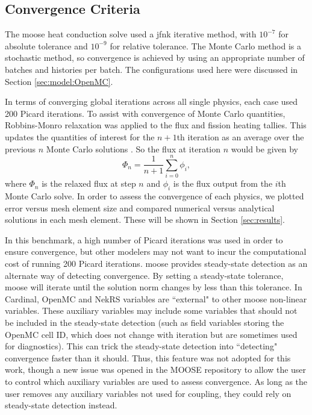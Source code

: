\documentclass[letterpaper]{mc2023}
\begin{document}
\subsection{Convergence Criteria}
The \gls{moose} heat conduction solve used a \gls{jfnk} iterative method, with $10^{-7}$ for absolute tolerance and $10^{-9}$ for
relative tolerance. The Monte Carlo method is a stochastic method, so convergence is achieved by using an appropriate number of
batches and histories per batch. The configurations used here were discussed in Section \ref{sec:model:OpenMC}.

In terms of converging global iterations across all single physics, each case used 200 Picard iterations. To assist with
convergence of Monte Carlo quantities, Robbins-Monro relaxation was applied to the flux and fission heating tallies. This updates the
quantities of interest for the $n+1$th iteration as an average over the previous $n$ Monte Carlo solutions \cite{dufek}.
So the flux at iteration $n$ would be given by
\begin{equation}\label{eq:Robbins-Monro}
    \Phi_{n} = \frac{1}{n+1} \sum_{i=0}^{n} \phi_{i},
\end{equation}
where $\Phi_{n}$ is the relaxed flux at step $n$ and $\phi_{i}$ is the flux output from the $i$th Monte Carlo solve. In order to assess
the convergence of each physics, we plotted error versus mesh element size and compared numerical versus analytical solutions in each
mesh element. These will be shown in Section \ref{sec:results}.

In this benchmark, a high number of Picard iterations was used in order to ensure convergence, but other modelers may not want to incur
the computational cost of running 200 Picard iterations. \gls{moose} provides steady-state detection as an alternate way of detecting
convergence. By setting a steady-state tolerance, \gls{moose} will iterate until the solution norm changes by less than this tolerance.
In Cardinal, OpenMC and NekRS variables are ``external" to other \gls{moose} non-linear variables. These auxiliary variables may include
some variables that should not be included in the steady-state detection (such as field variables storing the OpenMC cell ID, which does
not change with iteration but are sometimes used for diagnostics). This can trick the steady-state detection into ``detecting" convergence
faster than it should. Thus, this feature was not adopted for this work, though a new issue was opened in the MOOSE repository to allow
the user to control which auxiliary variables are used to assess convergence.  As long as the user removes any auxiliary variables not
used for coupling, they could rely on steady-state detection instead.
\end{document}
